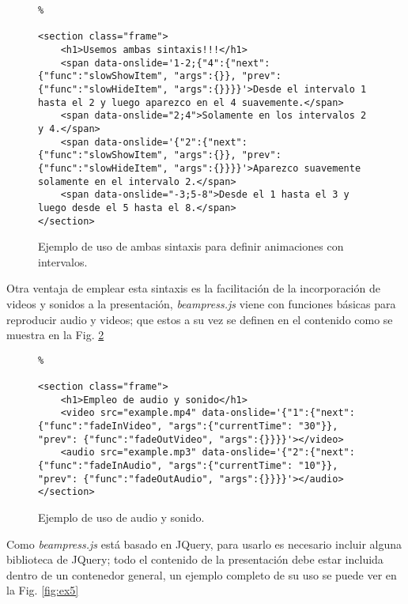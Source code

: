 		\begin{figure}[htb]%
			\begin{lstlisting}%

<section class="frame">
	<h1>Usemos ambas sintaxis!!!</h1>
    <span data-onslide='1-2;{"4":{"next":{"func":"slowShowItem", "args":{}}, "prev": {"func":"slowHideItem", "args":{}}}}'>Desde el intervalo 1 hasta el 2 y luego aparezco en el 4 suavemente.</span>
    <span data-onslide="2;4">Solamente en los intervalos 2 y 4.</span>
    <span data-onslide='{"2":{"next":{"func":"slowShowItem", "args":{}}, "prev": {"func":"slowHideItem", "args":{}}}}'>Aparezco suavemente solamente en el intervalo 2.</span>
    <span data-onslide="-3;5-8">Desde el 1 hasta el 3 y luego desde el 5 hasta el 8.</span>
</section>				
			\end{lstlisting}
		\caption{
			Ejemplo de uso de ambas sintaxis para definir animaciones con intervalos. 
			\label{fig:ex3} }
		\end{figure}

	Otra ventaja de emplear esta sintaxis es la facilitación de la incorporación de videos y sonidos a la presentación, \textit{beampress.js} viene con funciones básicas para reproducir audio y videos; que estos a su vez se definen en el contenido como se muestra en la Fig. \ref{fig:ex4}

		\begin{figure}[htb]%
			\begin{lstlisting}%

<section class="frame">
	<h1>Empleo de audio y sonido</h1>
	<video src="example.mp4" data-onslide='{"1":{"next":{"func":"fadeInVideo", "args":{"currentTime": "30"}}, "prev": {"func":"fadeOutVideo", "args":{}}}}'></video>
	<audio src="example.mp3" data-onslide='{"2":{"next":{"func":"fadeInAudio", "args":{"currentTime": "10"}}, "prev": {"func":"fadeOutAudio", "args":{}}}}'></audio>    
</section>				
			\end{lstlisting}
		\caption{
			Ejemplo de uso de audio y sonido. 
			\label{fig:ex4} }
		\end{figure}		

	Como \textit{beampress.js} está basado en JQuery, para usarlo es necesario incluir alguna biblioteca de JQuery; todo el contenido de la presentación debe estar incluida dentro de un contenedor general, un ejemplo completo de su uso se puede ver en la Fig. \ref{fig:ex5}

